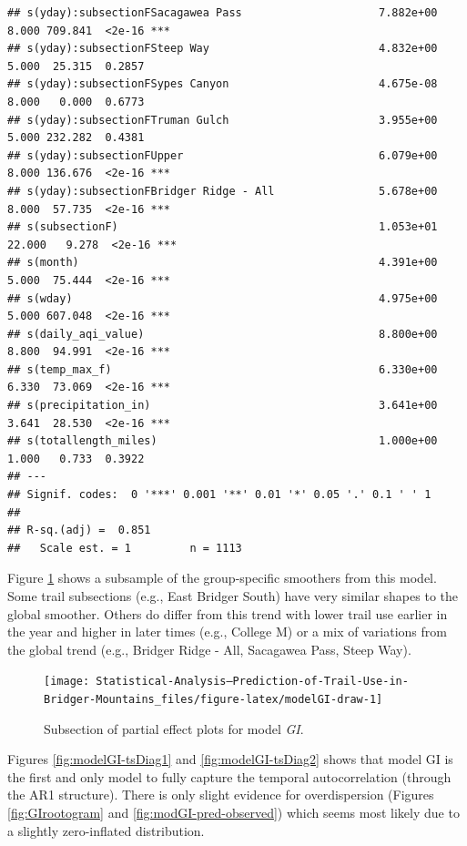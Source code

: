 \documentclass[
]{book}
\begin{document}
\begin{verbatim}
## s(yday):subsectionFSacagawea Pass                     7.882e+00  8.000 709.841  <2e-16 ***
## s(yday):subsectionFSteep Way                          4.832e+00  5.000  25.315  0.2857    
## s(yday):subsectionFSypes Canyon                       4.675e-08  8.000   0.000  0.6773    
## s(yday):subsectionFTruman Gulch                       3.955e+00  5.000 232.282  0.4381    
## s(yday):subsectionFUpper                              6.079e+00  8.000 136.676  <2e-16 ***
## s(yday):subsectionFBridger Ridge - All                5.678e+00  8.000  57.735  <2e-16 ***
## s(subsectionF)                                        1.053e+01 22.000   9.278  <2e-16 ***
## s(month)                                              4.391e+00  5.000  75.444  <2e-16 ***
## s(wday)                                               4.975e+00  5.000 607.048  <2e-16 ***
## s(daily_aqi_value)                                    8.800e+00  8.800  94.991  <2e-16 ***
## s(temp_max_f)                                         6.330e+00  6.330  73.069  <2e-16 ***
## s(precipitation_in)                                   3.641e+00  3.641  28.530  <2e-16 ***
## s(totallength_miles)                                  1.000e+00  1.000   0.733  0.3922    
## ---
## Signif. codes:  0 '***' 0.001 '**' 0.01 '*' 0.05 '.' 0.1 ' ' 1
## 
## R-sq.(adj) =  0.851   
##   Scale est. = 1         n = 1113
\end{verbatim}

Figure \ref{fig:modelGI-draw} shows a subsample of the group-specific smoothers from this model. Some trail subsections (e.g., East Bridger South) have very similar shapes to the global smoother. Others do differ from this trend with lower trail use earlier in the year and higher in later times (e.g., College M) or a mix of variations from the global trend (e.g., Bridger Ridge - All, Sacagawea Pass, Steep Way).

\begin{figure}

{\centering \texttt{[image: Statistical-Analysis--Prediction-of-Trail-Use-in-Bridger-Mountains\_files/figure-latex/modelGI-draw-1]} 

}

\caption{Subsection of partial effect plots for model \emph{GI}.}\label{fig:modelGI-draw}
\end{figure}

Figures \ref{fig:modelGI-tsDiag1} and \ref{fig:modelGI-tsDiag2} shows that model GI is the first and only model to fully capture the temporal autocorrelation (through the AR1 structure). There is only slight evidence for overdispersion (Figures \ref{fig:GIrootogram} and \ref{fig:modGI-pred-observed}) which seems most likely due to a slightly zero-inflated distribution.
\end{document}
